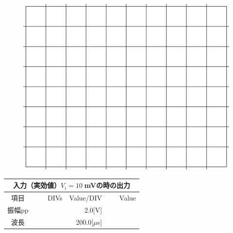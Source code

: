 \documentclass[uplatex,a4paper,11pt,oneside,openany]{jsbook}
\begin{document}
\begin{multicols}{2}
  \begin{figure}[H]
     \centering
      \includegraphics[keepaspectratio, scale=0.28, angle=0]
                  {figs/eps/grid.eps}
                  \label{fig:grid10mV}
  \end{figure}

  \begin{spacing}{1.5}
  \begin{tabular}{|c||r|r|r|}
    \multicolumn{4}{c}{入力（実効値）$V_i=10\;$mVの時の出力} \\ \hline
    項目 & DIVs & Value/DIV & Value \\ \hline \hline
    振幅pp & 　　　　 & 2.0[V]& 　　　　 \\ \hline
    波長 & 　　　　 & 200.0[$\mu$s]& 　　　　 \\ \hline
  \end{tabular}
\end{spacing}
\end{multicols}

\vfill
\end{document}
